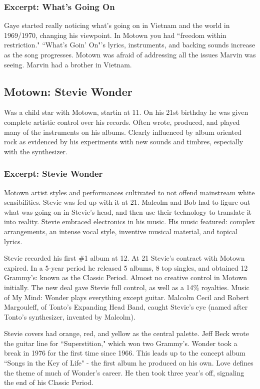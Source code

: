 \documentclass[12pt, a4paper, twoside, openright, titlepage]{book}
\begin{document}
\subsubsection{Excerpt: What's Going On}

Gaye started really noticing what's going on in Vietnam and the world in 1969/1970, changing his viewpoint. In Motown you had ``freedom within restriction." ``What's Goin' On"'s lyrics, instruments, and backing sounds increase as the song progresses. Motown was afraid of addressing all the issues Marvin was seeing. Marvin had a brother in Vietnam.


\subsection{Motown: Stevie Wonder}

Was a child star with Motown, startin at 11. On his 21st birthday he was given complete artistic control over his records. Often wrote, produced, and played many of the instruments on his albums. Clearly influenced by album oriented rock as evidenced by his experiments with new sounds and timbres, especially with the synthesizer.

\subsubsection{Excerpt: Stevie Wonder}

Motown artist styles and performances cultivated to not offend mainstream white sensibilities. Stevie was fed up with it at 21. Malcolm and Bob had to figure out what was going on in Stevie's head, and then use their technology to translate it into reality. Stevie embraced electronics in his music. His music featured: complex arrangements, an intense vocal style, inventive musical material, and topical lyrics. 


Stevie recorded his first \#1 album at 12. At 21 Stevie's contract with Motown expired. In a 5-year period he released 5 albums, 8 top singles, and obtained 12 Grammy's: known as the Classic Period. Almost no creative control in Motown initially. The new deal gave Stevie full control, as well as a 14\% royalties. Music of My Mind: Wonder plays everything except guitar. Malcolm Cecil and Robert Margouleff, of Tonto's Expanding Head Band, caught Stevie's eye (named after Tonto's synthesizer, invented by Malcolm).

Stevie covers had orange, red, and yellow as the central palette. Jeff Beck wrote the guitar line for ``Superstition," which won two Grammy's. Wonder took a break in 1976 for the first time since 1966. This leads up to the concept album ``Songs in the Key of Life" - the first album he produced on his own. Love defines the theme of much of Wonder's career. He then took three year's off, signaling the end of his Classic Period.
\end{document}
